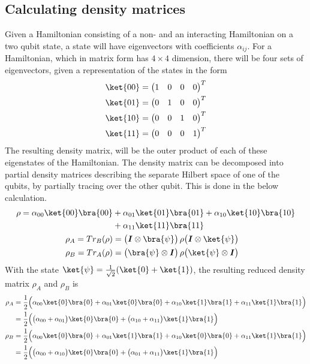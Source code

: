 \subsection{Calculating density matrices}
Given a Hamiltonian consisting of a non- and an interacting Hamiltonian on a two qubit state, a state will have eigenvectors with coefficients $\alpha_{ij}$. For a Hamiltonian, which in matrix form has $4\times 4$ dimension, there will be four sets of eigenvectors, given a representation of the states in the form
\begin{align}
    \ket{00} = \begin{pmatrix}1& 0 & 0 & 0
    \end{pmatrix}^T \\ 
    \ket{01} = \begin{pmatrix}0& 1 & 0 & 0
    \end{pmatrix}^T \\
    \ket{10} = \begin{pmatrix}0& 0 & 1 & 0
    \end{pmatrix}^T \\
    \ket{11} = \begin{pmatrix}0& 0 & 0 & 1
    \end{pmatrix}^T 
\end{align}
The resulting density matrix, will be the outer product of each of these eigenstates of the Hamiltonian. The density matrix can be decomposed into partial density matrices describing the separate Hilbert space of one of the qubits, by partially tracing over the other qubit. This is done in the below calculation.
\begin{align}
        \rho = \alpha_{00} \ket{00}\bra{00} &+ \alpha_{01} \ket{01}\bra{01} + \alpha_{10} \ket{10}\bra{10}\nonumber\\ &+ \alpha_{11} \ket{11}\bra{11} \nonumber\\ 
        \rho_A = Tr_B(\rho)  &= \big(\boldsymbol{I}\otimes \bra{\psi}\big)\, \rho \big( \boldsymbol{I}\otimes \ket{\psi}\big) \nonumber\\ \rho_B = Tr_A(\rho)  &= \big(\bra{\psi}\otimes \boldsymbol{I}\big)\, \rho \big(\ket{\psi}\otimes \boldsymbol{I}\big) \nonumber
\end{align}
With the state $\ket{\psi} = \frac{1}{\sqrt{2}} (\ket{0} + \ket{1})$, the resulting reduced density matrix $\rho_A$ and $\rho_B$ is
\begin{align}
    \rho_A &= \frac{1}{2} \Big( \alpha_{00} \ket{0}\bra{0} + \alpha_{01} \ket{0}\bra{0} + \alpha_{10} \ket{1}\bra{1} + \alpha_{11} \ket{1}\bra{1}    \Big)\nonumber \\ 
    &= \frac{1}{2} \Big(\big(\alpha_{00}+\alpha_{01}\big)\ket{0}\bra{0} + \big(\alpha_{10}+\alpha_{11}\big)\ket{1}\bra{1}\Big)\label{eq:rho_a} \\
    \rho_B &= \frac{1}{2 } \Big( \alpha_{00} \ket{0}\bra{0} + \alpha_{01} \ket{1}\bra{1} + \alpha_{10} \ket{0}\bra{0} + \alpha_{11} \ket{1}\bra{1}\Big)\nonumber\\
    &= \frac{1}{2} \Big(\big(\alpha_{00}+\alpha_{10}\big)\ket{0}\bra{0} + \big(\alpha_{01}+\alpha_{11}\big)\ket{1}\bra{1}\Big)
\end{align}
